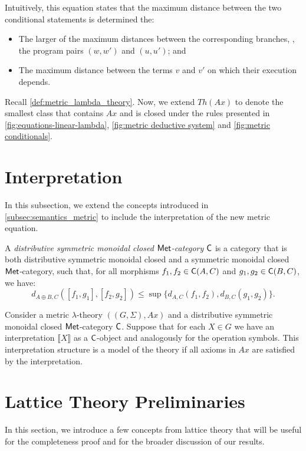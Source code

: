 Intuitively, this equation states that the maximum distance between the two conditional statements is determined the:

\begin{itemize}
    \item The larger of the maximum distances between the corresponding branches, \ie, the program pairs $(w, w')$ and $(u, u')$; and
    \item The maximum distance between the terms $v$ and $v'$ on which their execution depends.
\end{itemize}


Recall \autoref{def:metric_lambda_theory}. Now, we extend \( Th(Ax) \) to denote the smallest class that contains \( Ax \) and is closed under the rules presented in \autoref{fig:equations-linear-lambda}, \autoref{fig:metric deductive system} and \autoref{fig:metric conditionals}.


\section{Interpretation}

In this subsection, we extend the concepts introduced in \autoref{subsec:semantics_metric} to include the interpretation of the new metric equation.

\begin{definition}
  A \emph{distributive symmetric monoidal closed $\mathsf{Met}$-category} $\mathsf{C}$ is a category that is both distributive symmetric monoidal closed  and a symmetric monoidal closed $\mathsf{Met}$‑category, such that, for all morphisms $f_1, f_2 \in \mathsf{C}(A, C)$ and $g_1, g_2 \in \mathsf{C}(B, C)$, we have:
\[
  d_{A \oplus B, C}([f_1, g_1], [f_2, g_2]) \leq \sup \{d_{A,C}(f_1, f_2), d_{B,C}(g_1, g_2)\}.
\]
\end{definition}


\begin{definition}
  Consider a metric $\lambda$-theory $((G,\Sigma),Ax)$ and a distributive symmetric monoidal closed $\mathsf{Met}$-category $\mathsf{C}$. Suppose that for each $X \in G$ we have an interpretation $\llbracket X \rrbracket$ as a $\mathsf{C}$-object and analogously for the operation symbols. This interpretation structure is a model of the theory if all axioms in $Ax$ are satisfied by the interpretation.
\end{definition}



\section{Lattice Theory Preliminaries}
In this section, we introduce a few concepts from lattice theory that will be useful for the completeness proof and for the broader discussion of our results.


